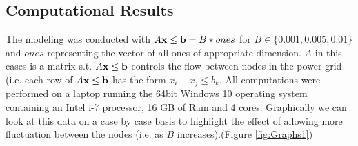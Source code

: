 \subsection{Computational Results}


The modeling was conducted with $A\bold x\leq \bold b = B*ones$ for $B\in\{0.001, 0.005,0.01\}$ and $ones$ representing the vector of all ones of appropriate dimension. 
$A$ in this cases is a matrix s.t. $A\bold x\leq \bold b$ controls the flow between nodes in the power grid (i.e. each row of $A\bold x\leq \bold b$ has the form $x_i-x_j\leq b_k$. 
All computations were performed on a laptop running the 64bit Windows 10 operating system containing an Intel i-7 processor, 16 GB of Ram and 4 cores. 
Graphically we can look at this data on a case by case basis to highlight the effect of allowing more fluctuation between the nodes (i.e. as $B$ increases).(Figure \ref{fig:Graphs1}) 


